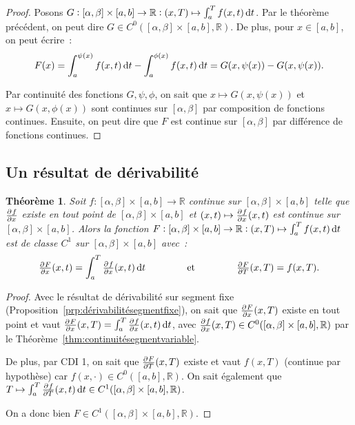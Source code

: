 \documentclass{report}
\newtheorem{thm}{Théorème}[chapter]
\theoremstyle{definition}
\theoremstyle{remark}
\newcommand{\R}{\mathbb R}
\newcommand{\CDII}{{CDI 1}}
\begin{document}
			\begin{proof} Posons $G : [\alpha, \beta] \times [a, b] \to \R : (x, T) \mapsto \int_a^T f(x, t)\dif t$. Par le théorème précédent, on peut dire
			$G \in C^0([\alpha, \beta] \times [a, b], \R)$. De plus, pour $x \in [a, b]$, on peut écrire~:
			\[F(x) = \int_a^{\psi(x)}f(x, t)\dif t - \int_a^{\phi(x)}f(x, t)\dif t = G(x, \psi(x)) - G(x, \psi(x)).\]

			Par continuité des fonctions $G, \psi, \phi$, on sait que $x \mapsto G(x, \psi(x))$ et $x \mapsto G(x, \phi(x))$ sont continues sur $[\alpha, \beta]$
			par composition de fonctions continues. Ensuite, on peut dire que $F$ est continue sur $[\alpha, \beta]$ par différence de fonctions continues.
			\end{proof}

		\subsection{Un résultat de dérivabilité}
			\begin{thm}\label{thm:dérivabilitésegmentvariable} Soit $f : [\alpha, \beta] \times [a, b] \to \R$ continue sur $[\alpha, \beta] \times [a, b]$
			telle que $\pd fx$ existe en tout point de $[\alpha, \beta] \times [a, b]$ et $(x, t) \mapsto \pd fx(x, t)$ est continue sur
			$[\alpha, \beta] \times [a, b]$. Alors la fonction $F : [\alpha, \beta] \times [a, b] \to \R : (x, T) \mapsto \int_a^Tf(x, t)\dif t$ est de classe
			$C^1$ sur $[\alpha, \beta] \times [a, b]$ avec~:
			\[\pd Fx(x, t) = \int_a^T\pd fx(x, t)\dif t \qquad\qquad\text{ et }\qquad\qquad \pd FT(x, T) = f(x, T).\]
			\end{thm}

			\begin{proof} Avec le résultat de dérivabilité sur segment fixe (Proposition~\ref{prp:dérivabilitésegmentfixe}), on sait que $\pd Fx(x, T)$ existe
			en tout point et vaut $\pd Fx(x, T) = \int_a^T\pd fx(x, t)\dif t$, avec $\pd fx(x, T) \in C^0([\alpha, \beta] \times [a, b], \R)$ par le
			Théorème~\ref{thm:continuitésegmentvariable}.

			De plus, par \CDII, on sait que $\pd FT(x, T)$ existe et vaut $f(x, T)$ (continue par hypothèse) car $f(x, \cdot) \in C^0([a, b], \R)$. On sait
			également que $T \mapsto \int_a^T \pd fT(x, t)\dif t \in C^1([\alpha, \beta] \times [a, b], \R)$.

			On a donc bien $F \in C^1([\alpha, \beta] \times [a, b], \R)$.
			\end{proof}
\end{document}
